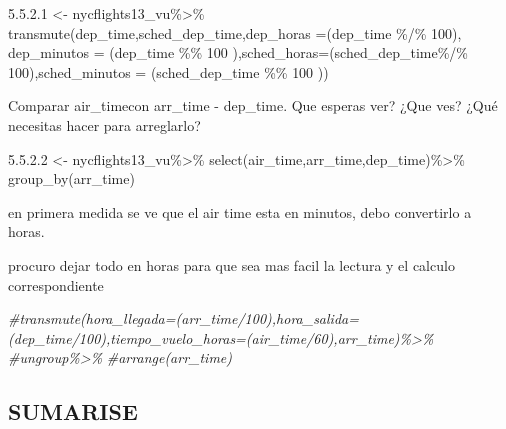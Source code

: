 \documentclass[
]{article}
\newenvironment{Shaded}{\begin{snugshade}}{\end{snugshade}}
\newcommand{\AttributeTok}[1]{\textcolor[rgb]{0.77,0.63,0.00}{#1}}
\newcommand{\CommentTok}[1]{\textcolor[rgb]{0.56,0.35,0.01}{\textit{#1}}}
\newcommand{\DecValTok}[1]{\textcolor[rgb]{0.00,0.00,0.81}{#1}}
\newcommand{\FunctionTok}[1]{\textcolor[rgb]{0.00,0.00,0.00}{#1}}
\newcommand{\NormalTok}[1]{#1}
\newcommand{\OtherTok}[1]{\textcolor[rgb]{0.56,0.35,0.01}{#1}}
\newcommand{\SpecialCharTok}[1]{\textcolor[rgb]{0.00,0.00,0.00}{#1}}
\newcommand{\StringTok}[1]{\textcolor[rgb]{0.31,0.60,0.02}{#1}}
\begin{document}
\begin{Shaded}
\begin{Highlighting}[]
\StringTok{\textquotesingle{}5.5.2.1\textquotesingle{}} \OtherTok{\textless{}{-}}\NormalTok{ nycflights13\_vu}\SpecialCharTok{\%\textgreater{}\%}
\FunctionTok{transmute}\NormalTok{(dep\_time,sched\_dep\_time,}\AttributeTok{dep\_horas =}\NormalTok{(dep\_time }\SpecialCharTok{\%/\%} \DecValTok{100}\NormalTok{), }\AttributeTok{dep\_minutos =}\NormalTok{ (dep\_time }\SpecialCharTok{\%\%} \DecValTok{100}\NormalTok{ ),}\AttributeTok{sched\_horas=}\NormalTok{(sched\_dep\_time}\SpecialCharTok{\%/\%} \DecValTok{100}\NormalTok{),}\AttributeTok{sched\_minutos =}\NormalTok{ (sched\_dep\_time }\SpecialCharTok{\%\%} \DecValTok{100}\NormalTok{ ))}
\end{Highlighting}
\end{Shaded}

Comparar air\_timecon arr\_time - dep\_time. Que esperas ver? ¿Que ves?
¿Qué necesitas hacer para arreglarlo?

\begin{Shaded}
\begin{Highlighting}[]
\StringTok{\textquotesingle{}5.5.2.2\textquotesingle{}} \OtherTok{\textless{}{-}}\NormalTok{ nycflights13\_vu}\SpecialCharTok{\%\textgreater{}\%}
\FunctionTok{select}\NormalTok{(air\_time,arr\_time,dep\_time)}\SpecialCharTok{\%\textgreater{}\%}
\FunctionTok{group\_by}\NormalTok{(arr\_time)}
\end{Highlighting}
\end{Shaded}

en primera medida se ve que el air time esta en minutos, debo
convertirlo a horas.

procuro dejar todo en horas para que sea mas facil la lectura y el
calculo correspondiente

\begin{Shaded}
\begin{Highlighting}[]
\CommentTok{\#transmute(hora\_llegada=(arr\_time/100),hora\_salida=(dep\_time/100),tiempo\_vuelo\_horas=(air\_time/60),arr\_time)\%\textgreater{}\%}
\CommentTok{\#ungroup\%\textgreater{}\%}
\CommentTok{\#arrange(arr\_time)}
\end{Highlighting}
\end{Shaded}

\hypertarget{sumarise}{%
\subsection{SUMARISE}\label{sumarise}}
\end{document}
